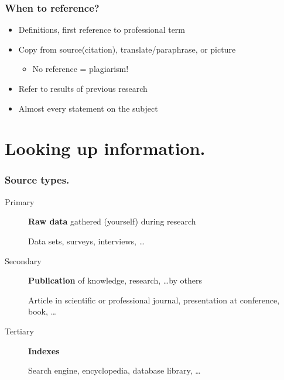 \documentclass[aspectratio=169]{beamer}
\begin{document}
\begin{frame}
    \frametitle{When to reference?}

    \begin{itemize}
        \item Definitions, first reference to professional term
        \item Copy from source(citation), translate/paraphrase, or picture
              \begin{itemize}
                  \item No reference = \alert{plagiarism!}
              \end{itemize}
        \item Refer to results of previous research
        \item Almost every statement on the subject
    \end{itemize}

    \bigskip

\end{frame}

\section{Looking up information.}

\begin{frame}
    \frametitle{Source types.}

    \begin{description}
        \item[Primary] \textbf{Raw data} gathered (yourself) during research

            Data sets, surveys, interviews, \ldots

        \item[Secondary] \textbf{Publication} of knowledge, research, \ldots by others

            Article in scientific or professional journal, presentation at conference, book, \ldots

        \item[Tertiary] \textbf{Indexes}

            Search engine, encyclopedia, database library, \ldots

    \end{description}

\end{frame}
\end{document}
